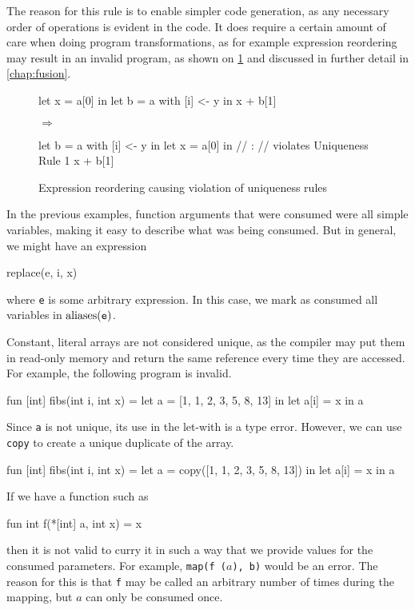 The reason for this rule is to enable simpler code generation, as any
necessary order of operations is evident in the code.  It does require
a certain amount of care when doing program transformations, as for
example expression reordering may result in an invalid program, as
shown on \cref{fig:reordering-uniqueness-violation} and discussed in
further detail in \cref{chap:fusion}.

\begin{figure}
\centering
\begin{minipage}{0.25\columnwidth}
\begin{colorcode}
let x = a[0] in
let b = a with
  [i] <- y in
x + b[1]
\end{colorcode}
\end{minipage}
\begin{minipage}{0.05\columnwidth}
$\Rightarrow$
\end{minipage}
\begin{minipage}{0.6\columnwidth}
\begin{colorcode}
let b = a with [i] <- y in
let x = a[0] in // :
                // violates Uniqueness Rule 1
x + b[1]
\end{colorcode}
\end{minipage}
\caption{Expression reordering causing violation of uniqueness rules}
\label{fig:reordering-uniqueness-violation}
\end{figure}

In the previous examples, function arguments that were consumed were
all simple variables, making it easy to describe what was being
consumed.  But in general, we might have an expression
\begin{colorcode}
  replace(e, i, x)
\end{colorcode}
where \texttt{e} is some arbitrary expression.  In this case, we mark
as consumed all variables in $\textrm{aliases}(\texttt{e})$.

Constant, literal arrays are not considered unique, as the compiler
may put them in read-only memory and return the same reference every
time they are accessed.  For example, the following program is
invalid.
\begin{colorcode}
  fun [int] fibs(int i, int x) =
    let a = [1, 1, 2, 3, 5, 8, 13] in
    let a[i] = x in a
\end{colorcode}
Since \texttt{a} is not unique, its use in the let-with is a type
error.  However, we can use \texttt{copy} to create a unique duplicate
of the array.
\begin{colorcode}
  fun [int] fibs(int i, int x) =
    let a = copy([1, 1, 2, 3, 5, 8, 13]) in
    let a[i] = x in a
\end{colorcode}

If we have a function such as
\begin{colorcode}
  fun int f(*[int] a, int x) = x
\end{colorcode}
then it is not valid to curry it in such a way that we provide values
for the consumed parameters.  For example, \texttt{map(f ($a$), b)}
would be an error.  The reason for this is that \texttt{f} may be
called an arbitrary number of times during the mapping, but $a$ can
only be consumed once.

